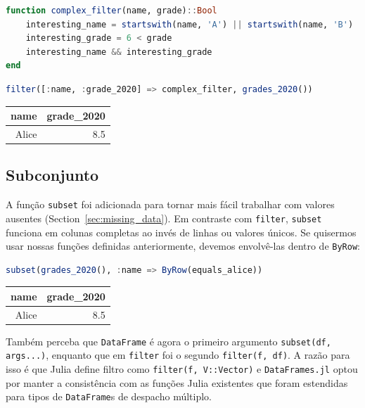 \documentclass[
  notoc %
]{tufte-book}
\newcommand{\passthrough}[1]{#1}
\begin{document}
\begin{lstlisting}[language=Julia]
function complex_filter(name, grade)::Bool
    interesting_name = startswith(name, 'A') || startswith(name, 'B')
    interesting_grade = 6 < grade
    interesting_name && interesting_grade
end
\end{lstlisting}

\begin{lstlisting}[language=Julia]
filter([:name, :grade_2020] => complex_filter, grades_2020())
\end{lstlisting}

\begin{longtable}[]{@{}rr@{}}
\toprule
name & grade\_2020 \\
\midrule
\endhead
Alice & 8.5 \\
\bottomrule
\end{longtable}

\hypertarget{sec:subset}{%
\subsection{Subconjunto}\label{sec:subset}}

A função \passthrough{\lstinline!subset!} foi adicionada para tornar
mais fácil trabalhar com valores ausentes
(Section~\ref{sec:missing_data}). Em contraste com
\passthrough{\lstinline!filter!}, \passthrough{\lstinline!subset!}
funciona em colunas completas ao invés de linhas ou valores únicos. Se
quisermos usar nossas funções definidas anteriormente, devemos
envolvê-las dentro de \passthrough{\lstinline!ByRow!}:

\begin{lstlisting}[language=Julia]
subset(grades_2020(), :name => ByRow(equals_alice))
\end{lstlisting}

\begin{longtable}[]{@{}rr@{}}
\toprule
name & grade\_2020 \\
\midrule
\endhead
Alice & 8.5 \\
\bottomrule
\end{longtable}

Também perceba que \passthrough{\lstinline!DataFrame!} é agora o
primeiro argumento \passthrough{\lstinline!subset(df, args...)!},
enquanto que em \passthrough{\lstinline!filter!} foi o segundo
\passthrough{\lstinline!filter(f, df)!}. A razão para isso é que Julia
define filtro como \passthrough{\lstinline!filter(f, V::Vector)!} e
\passthrough{\lstinline!DataFrames.jl!} optou por manter a consistência
com as funções Julia existentes que foram estendidas para tipos de
\passthrough{\lstinline!DataFrame!}s de despacho múltiplo.
\end{document}
